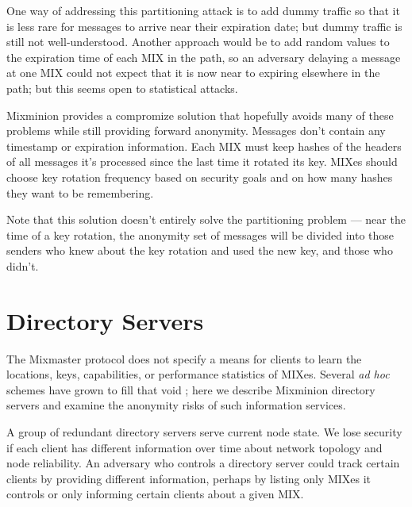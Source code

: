 \documentclass{llncs}
\begin{document}

One way of addressing this partitioning attack is to add dummy traffic
so that it is less rare for messages to arrive near their expiration date;
but dummy traffic is still not well-understood. Another approach would
be to add random values to the expiration time of each MIX in the path,
so an adversary delaying a message at one MIX could not expect that it
is now near to expiring elsewhere in the path; but this seems open to
statistical attacks.

Mixminion provides a compromize solution that hopefully avoids many of
these problems while still providing forward anonymity. Messages don't
contain any timestamp or expiration information. Each MIX must keep
hashes of the headers of all messages it's processed since the last time
it rotated its key. MIXes should choose key rotation frequency based on
security goals and on how many hashes they want to be remembering.

Note that this solution doesn't entirely solve the partitioning problem
--- near the time of a key rotation, the anonymity set of messages will
be divided into those senders who knew about the key rotation and used
the new key, and those who didn't.


\section{Directory Servers}
\label{sec:dir-servers}

The Mixmaster protocol does not specify a means for clients to learn the
locations, keys, capabilities, or performance statistics of MIXes. Several
\emph{ad hoc} schemes have grown to fill that void \cite{levien}; here
we describe Mixminion directory servers and examine the anonymity risks
of such information services.

A group of redundant directory servers serve current node state. We lose
security if each client has different information over time about network
topology and node reliability. An adversary who controls a directory
server could track certain clients by providing different information,
perhaps by listing only MIXes it controls or only informing certain
clients about a given MIX.
\end{document}
